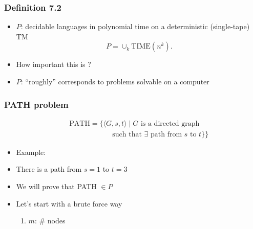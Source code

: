 \begin{frame}[allowframebreaks] \frametitle{Definition 7.2}
  \begin{itemize}
\item $P$: decidable languages in polynomial time
on a deterministic (single-tape) TM
\begin{equation*}
  P=\cup_k
\text{TIME}(n^k).
\end{equation*}
\item How important this is ?

\item [] $P$: ``roughly'' corresponds to problems solvable
on a computer



\end{itemize}\end{frame} \begin{frame}[allowframebreaks] \frametitle{PATH problem}
\begin{eqnarray*}
&&  \text{PATH}
=\{
\langle  G,s,t\rangle \mid \mbox{$G$ is a directed graph}\\
&& \qquad\qquad\qquad
\mbox{such that $\exists$ path from $s$ to $t$}\}
\}
\end{eqnarray*}
  \begin{itemize}
  \item Example:

  \begin{center}
\end{center}
\item[] There is a path from $s=1$ to $t=3$
\item We will prove that PATH $\in P$
\item Let's start with a brute force way

  \begin{enumerate}
  \item $m$: \# nodes


\end{enumerate}
\end{itemize}
\end{frame}
